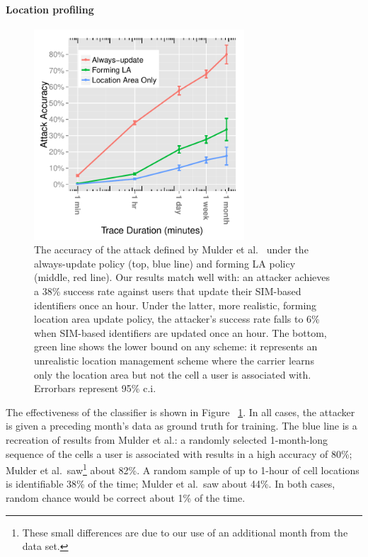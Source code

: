 \paragraph*{Location profiling}
\begin{figure}
	\centering
	\includegraphics[width=0.7\textwidth]{graphics/mulder}
	\caption{The accuracy of the attack defined by Mulder et al.~\cite{Mulder:2008} under the always-update policy (top, blue line) and forming LA policy (middle, red line). Our results match well with\cite{Mulder:2008}: an attacker achieves a 38\% success rate against users that update their SIM-based identifiers once an hour.  Under the latter, more realistic, forming location area update policy, the attacker's success rate falls to 6\% when SIM-based identifiers are updated once an hour. The bottom, green line shows the lower bound on any scheme: it represents an unrealistic location management scheme where the carrier learns only the location area but not the cell a user is associated with. Errorbars represent 95\% c.i.}
	\label{fig:mulder}
\end{figure}

The effectiveness of the classifier is shown in Figure~
\ref{fig:mulder}. In all cases, the attacker is given a preceding month's 
data as ground truth for training. The blue line is a recreation of results 
from Mulder et al.: a randomly selected  1-month-long sequence of the cells a 
user is associated with results in a high accuracy  of 80\%; Mulder et 
al.\ saw\footnote{These small differences are due to our use of an additional month from the data set.} about 82\%. A random sample of up to 1-hour of cell locations is identifiable 38\% of the time; Mulder et al.\ saw about 44\%. In both cases, random chance would be correct about 1\% of the time. 

